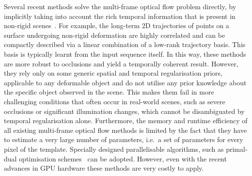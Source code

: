 Several recent methods solve the multi-frame optical flow problem directly, by 
implicitly taking into account the rich temporal information that is present in 
non-rigid scenes~\cite{irani2002multi,torresani2001tracking,torresani2002space,%
tomasi2012dense,ricco2013video,garg2013variational}. 
For example, the long-term 2D trajectories of points on a surface undergoing
non-rigid deformation are highly correlated and can be compactly described
via a linear combination of a low-rank trajectory basis. 
This basis is typically learnt from the input sequence itself. In 
this way, these methods are more robust to occlusions and yield a temporally coherent 
result. However, they rely only on some generic spatial and temporal regularisation 
priors, applicable to any deformable object and do not utilise any prior knowledge 
about the specific object observed in the scene. This makes them fail in more challenging 
conditions that often occur in real-world scenes, such as severe occlusions or 
significant illumination changes, which cannot be disambiguated by temporal
regularisation alone.
Furthermore, the memory and runtime efficiency of all existing multi-frame optical 
flow methods is limited by the fact that they have to estimate a very large number 
of parameters, i.e.~a set of parameters for every pixel of the template.
Specially designed parallelisable algorithms, such as primal-dual optimisation
schemes~\cite{wedel2009improved,garg2013variational} 
can be adopted. However, even with the recent advances in GPU hardware these
methods are very costly to apply.

